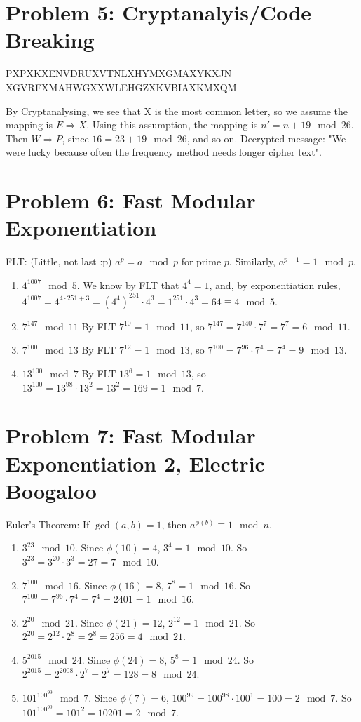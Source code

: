 \documentclass[12pt]{article}
\begin{document}
\section{Problem 5: Cryptanalyis/Code Breaking}
PXPXKXENVDRUXVTNLXHYMXGMAXYKXJN
\newline XGVRFXMAHWGXXWLEHGZXKVBIAXKMXQM

By Cryptanalysing, we see that X is the most common letter, so we assume the mapping is $E\Longrightarrow X$.
Using this assumption, the mapping is $n'=n+19 \mod{26}$. Then $W\Longrightarrow P$, since $16=23+19 \mod{26}$, and so on.
Decrypted message: "We were lucky because often the frequency method needs longer cipher text".
\section{Problem 6: Fast Modular Exponentiation}
FLT: (Little, not last :p) $a^p=a \mod p$ for prime $p$. Similarly, $a^{p-1}=1 \mod p$.
\begin{enumerate}
    \item $4^{1007} \mod 5$. We know by FLT that $4^4=1$, and, by exponentiation rules, $4^{1007}=4^{4\cdot251+3}=(4^{4})^{251}\cdot4^3=1^{251}\cdot4^3=64\equiv4\mod5$.
    \item $7^{147}\mod11$ By FLT $7^{10}=1\mod11$, so $7^{147}=7^{140}\cdot7^7=7^7=6\mod11$.
    \item $7^{100}\mod13$ By FLT $7^{12}=1\mod13$, so $7^{100}=7^{96}\cdot7^4=7^4=9\mod13$.
    \item $13^{100}\mod7$ By FLT $13^{6}=1\mod13$, so $13^{100}=13^{98}\cdot13^2=13^2=169=1\mod7$.
\end{enumerate}
\section{Problem 7: Fast Modular Exponentiation 2, Electric Boogaloo}
Euler's Theorem: If $\gcd(a,b)=1$, then $a^{\phi(b)}\equiv1\mod n$.
\begin{enumerate}
    \item $3^{23}\mod10$. Since $\phi(10)=4$, $3^4=1\mod10$. So $3^{23}=3^{20}\cdot3^3=27=7\mod10$.
    \item $7^{100}\mod16$. Since $\phi(16)=8$, $7^8=1\mod16$. So $7^{100}=7^{96}\cdot7^4=7^4=2401=1\mod16$.
    \item $2^{20}\mod21$. Since $\phi(21)=12$, $2^12=1\mod21$. So $2^{20}=2^{12}\cdot2^8=2^8=256=4\mod21$.
    \item $5^{2015}\mod24$. Since $\phi(24)=8$, $5^8=1\mod24$. So $2^{2015}=2^{2008}\cdot2^7=2^7=128=8\mod24$.
    \item $101^{100^{99}}\mod7$. Since $\phi(7)=6$, $100^{99}=100^{98}\cdot100^1=100=2\mod7$. So $101^{100^{99}}=101^{2}=10201=2\mod7$.
\end{enumerate}
\end{document}

